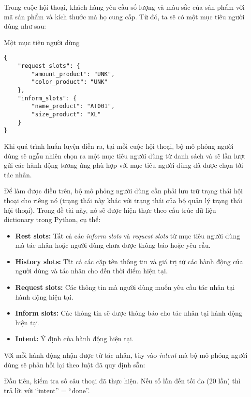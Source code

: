 Trong cuộc hội thoại, khách hàng yêu cầu số lượng và màu sắc của
sản phẩm với mã sản phẩm và kích thước mà họ cung cấp. Từ đó,
ta sẽ có một mục tiêu người dùng như sau:

\renewcommand{\textboxenvname}{Ví dụ}
\begin{textbox}{Một mục tiêu người dùng}
\begin{Verbatim}[breaklines=true, breakanywhere=true]
{
    "request_slots": {
    	"amount_product": "UNK",
    	"color_product": "UNK"
    },
    "inform_slots": {
    	"name_product": "AT001",
    	"size_product": "XL"
    }
}
\end{Verbatim}
\end{textbox}

Khi quá trình huấn luyện diễn ra, tại mỗi cuộc hội thoại, bộ mô phỏng
người dùng sẽ ngẫu nhiên chọn ra một mục tiêu người dùng từ danh sách
và sẽ lần lượt gửi các hành động tương ứng phù hợp với mục tiêu
người dùng đã được chọn tới tác nhân.

Để làm được điều trên, bộ mô phỏng người dùng cần phải lưu trữ
trạng thái hội thoại cho riêng nó (trạng thái này khác với trạng thái
của bộ quản lý trạng thái hội thoại). Trong đề tài này, nó sẽ được
hiện thực theo cấu trúc dữ liệu dictionary trong Python, cụ thể:

\begin{itemize}
    \item \textbf{Rest slots:} Tất cả các \textit{inform slots} và
    \textit{request slots} từ mục tiêu người dùng mà tác nhân hoặc
    người dùng chưa được thông báo hoặc yêu cầu.
    \item \textbf{History slots:} Tất cả các cặp tên thông tin và
    giá trị từ các hành động của người dùng và tác nhân cho đến
    thời điểm hiện tại.
    \item \textbf{Request slots:} Các thông tin mà người dùng muốn
    yêu cầu tác nhân tại hành động hiện tại.
    \item \textbf{Inform slots:} Các thông tin sẽ được thông báo
    cho tác nhân tại hành động hiện tại.
    \item \textbf{Intent:} Ý định của hành động hiện tại.
\end{itemize}

Với mỗi hành động nhận được từ tác nhân, tùy vào \textit{intent} mà
bộ mô phỏng người dùng sẽ phản hồi lại theo luật đã quy định sẵn:

Đầu tiên, kiểm tra số câu thoại đã thực hiện. Nếu số lần đến tối đa
(20 lần) thì trả lời với \enquote{intent} = \enquote{done}.

